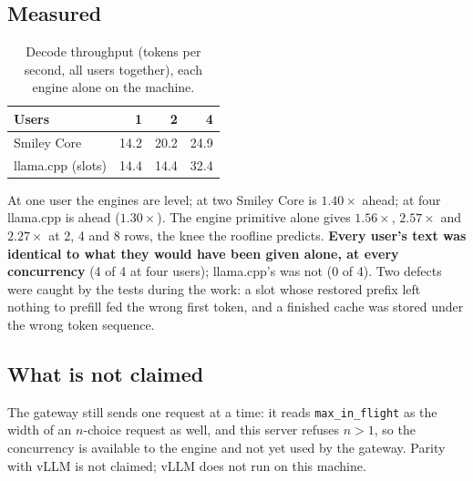 \subsection{Measured}

\begin{table}[h]
\centering
\caption{Decode throughput (tokens per second, all users together), each engine alone on the machine.}
\label{tab:phase18}
\begin{tabular}{lrrr}
\toprule
Users & 1 & 2 & 4 \\
\midrule
Smiley Core & 14.2 & 20.2 & 24.9 \\
llama.cpp (slots) & 14.4 & 14.4 & 32.4 \\
\bottomrule
\end{tabular}
\end{table}

At one user the engines are level; at two Smiley Core is $1.40\times$ ahead; at four llama.cpp is ahead ($1.30\times$). The engine primitive alone
gives $1.56\times$, $2.57\times$ and $2.27\times$ at 2, 4 and 8 rows, the knee the roofline predicts. \textbf{Every user's text was identical to what
they would have been given alone, at every concurrency} (4 of 4 at four users); llama.cpp's was not (0 of 4). Two defects were caught by the tests during the work: a slot whose restored prefix left nothing to prefill fed the wrong first token,
and a finished cache was stored under the wrong token sequence.

\subsection{What is not claimed}

The gateway still sends one request at a time: it reads \texttt{max\_in\_flight} as the width of an $n$-choice request as well, and this server refuses
$n>1$, so the concurrency is available to the engine and not yet used by the gateway. Parity with vLLM is not claimed; vLLM does not run on this
machine.
